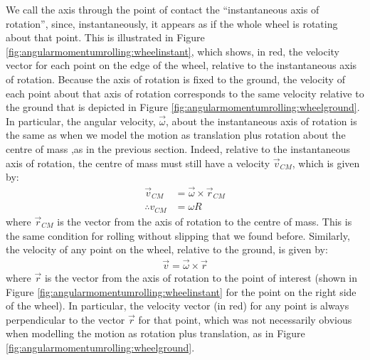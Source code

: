 We call the axis through the point of contact the ``instantaneous axis of rotation'', since, instantaneously, it appears as if the whole wheel is rotating about that point. This is illustrated in Figure \ref{fig:angularmomentumrolling:wheelinstant}, which shows, in red, the velocity vector for each point on the edge of the wheel, relative to the instantaneous axis of rotation. Because the axis of rotation is fixed to the ground, the velocity of each point about that axis of rotation corresponds to the same velocity relative to the ground that is depicted in Figure \ref{fig:angularmomentumrolling:wheelground}.
In particular, the angular velocity, $\vec \omega$, about the instantaneous axis of rotation is the same as when we model the motion as translation plus rotation about the centre of mass ,as in the previous section. Indeed, relative to the instantaneous axis of rotation, the centre of mass must still have a velocity $\vec v_{CM}$, which is given by:
\begin{align*}
\vec v_{CM} &= \vec\omega \times \vec r_{CM}\\
\therefore v_{CM} &= \omega R
\end{align*}
where $\vec r_{CM}$ is the vector from the axis of rotation to the centre of mass. This is the same condition for rolling without slipping that we found before. Similarly, the velocity of any point on the wheel, relative to the ground, is given by:
\begin{align*}
\vec v = \vec\omega \times \vec r
\end{align*}
where $\vec r$ is the vector from the axis of rotation to the point of interest (shown in Figure \ref{fig:angularmomentumrolling:wheelinstant} for the point on the right side of the wheel). In particular, the velocity vector (in red) for any point is always perpendicular to the vector $\vec r$ for that point, which was not necessarily obvious when modelling the motion as rotation plus translation, as in Figure \ref{fig:angularmomentumrolling:wheelground}.


